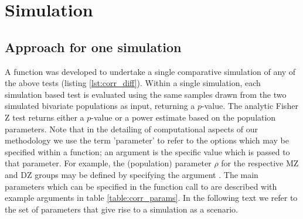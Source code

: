 \section{Simulation}
\subsection{Approach for one simulation}
A function  was developed to undertake a single comparative simulation of any of the above tests (listing \ref{lst:corr_diff}). Within a single simulation, each simulation based  test is evaluated using the same samples drawn from the two simulated bivariate populations as input, returning a $p$-value.  The analytic Fisher Z test returns either a $p$-value or a power estimate based on the population parameters.  Note that in the detailing of computational aspects of our methodology we use the term 'parameter' to refer to the options which may be specified within a function; an argument is the specific value which is passed to that parameter. For example, the (population) parameter $\rho$ for the respective MZ and DZ groups may be defined by specifying the argument . The main parameters which can be specified in the function call to  are described with example arguments in table \ref{table:corr_params}.  In the following text we refer to the set of parameters that give rise to a simulation as a scenario.

